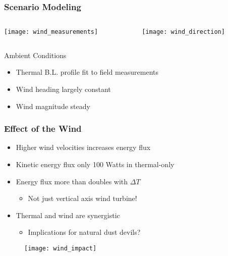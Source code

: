 \documentclass[mathserif]{beamer}
\begin{document}
%
%
%
\begin{frame}
\frametitle{Scenario Modeling}
 
 \begin{columns}[]
  \begin{column}{0.5\linewidth}

   \begin{center}
    \texttt{[image: wind\_measurements]}
   \end{center}

  \end{column}
  \begin{column}{0.5\linewidth}
 
   \begin{center}
    \texttt{[image: wind\_direction]}
   \end{center}
  
  \end{column}
\end{columns}


  \begin{block}{Ambient Conditions}
  \begin{itemize}
  \item	Thermal B.L. profile fit to field measurements
  \item Wind heading largely constant 
  \item Wind magnitude steady 
  \end{itemize}
  \end{block}	

\end{frame}



%
%
%
\begin{frame}
 \frametitle{Effect of the Wind}

  \begin{itemize}
    \item Higher wind velocities increases energy flux
    \item Kinetic energy flux only 100 Watts in thermal-only
    \item Energy flux more than doubles with $\Delta T$
    \begin{itemize}
    \item Not just vertical axis wind turbine!
    \end{itemize} 
    \item Thermal and wind are synergistic
    \begin{itemize}
      \item Implications for natural dust devils? 
    \end{itemize}
  \end{itemize}

 \begin{figure}[htb]
  \centering
  \texttt{[image: wind\_impact]}
 \end{figure}
 
\end{frame}
\end{document}
